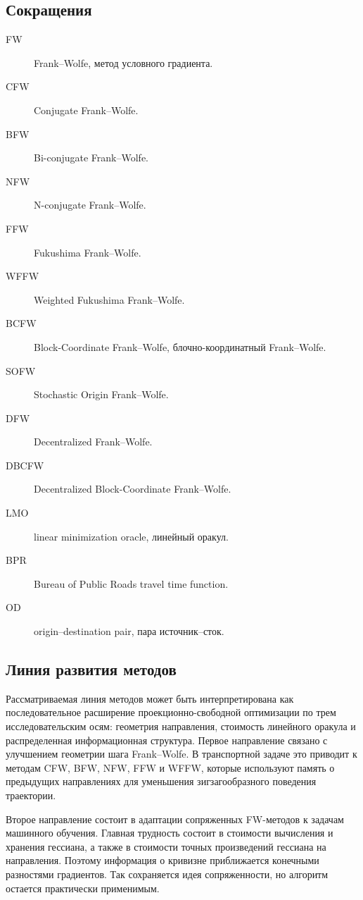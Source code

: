 \subsection*{Сокращения}

\begin{description}
    \item[FW] Frank--Wolfe, метод условного градиента.
    \item[CFW] Conjugate Frank--Wolfe.
    \item[BFW] Bi-conjugate Frank--Wolfe.
    \item[NFW] N-conjugate Frank--Wolfe.
    \item[FFW] Fukushima Frank--Wolfe.
    \item[WFFW] Weighted Fukushima Frank--Wolfe.
    \item[BCFW] Block-Coordinate Frank--Wolfe, блочно-координатный Frank--Wolfe.
    \item[SOFW] Stochastic Origin Frank--Wolfe.
    \item[DFW] Decentralized Frank--Wolfe.
    \item[DBCFW] Decentralized Block-Coordinate Frank--Wolfe.
    \item[LMO] linear minimization oracle, линейный оракул.
    \item[BPR] Bureau of Public Roads travel time function.
    \item[OD] origin--destination pair, пара источник--сток.
\end{description}

\subsection*{Линия развития методов}

Рассматриваемая линия методов может быть интерпретирована как последовательное расширение
проекционно-свободной оптимизации по трем исследовательским осям: геометрия направления,
стоимость линейного оракула и распределенная информационная структура.
Первое направление связано с улучшением геометрии шага Frank--Wolfe.
В транспортной задаче это приводит к методам CFW, BFW, NFW, FFW и WFFW, которые используют
память о предыдущих направлениях для уменьшения зигзагообразного поведения траектории.

Второе направление состоит в адаптации сопряженных FW-методов к задачам машинного обучения.
Главная трудность состоит в стоимости вычисления и хранения гессиана, а также в стоимости
точных произведений гессиана на направления.
Поэтому информация о кривизне приближается конечными разностями градиентов.
Так сохраняется идея сопряженности, но алгоритм остается практически применимым.

